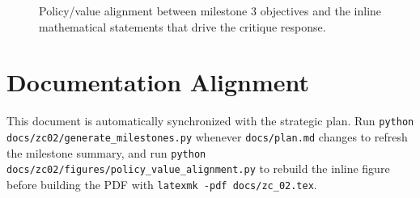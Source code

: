 \documentclass{article}
\begin{document}
\begin{figure}[t]
  \centering
  
  \caption{Policy/value alignment between milestone 3 objectives and the inline mathematical statements that drive the critique response.}
  \label{fig:policy-value-alignment}
\end{figure}

\section{Documentation Alignment}
This document is automatically synchronized with the strategic plan. Run
\texttt{python docs/zc02/generate\_milestones.py} whenever \texttt{docs/plan.md} changes to refresh the milestone summary, and run
\texttt{python docs/zc02/figures/policy\_value\_alignment.py} to rebuild the inline figure before
building the PDF with \texttt{latexmk -pdf docs/zc\_02.tex}.
\end{document}
